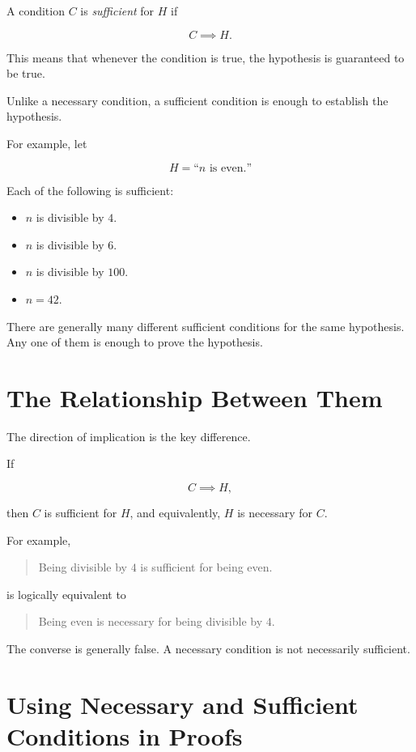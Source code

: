 \documentclass{essay}
\begin{document}
A condition \(C\) is \emph{sufficient} for \(H\) if

\[ C \implies H. \]

This means that whenever the condition is true, the hypothesis is guaranteed to be true.

Unlike a necessary condition, a sufficient condition is enough to establish the hypothesis.

For example, let

\[
  H = \text{``\(n\) is even.''}
\]

Each of the following is sufficient:

\begin{itemize}
  \item \(n\) is divisible by \(4\).
  \item \(n\) is divisible by \(6\).
  \item \(n\) is divisible by \(100\).
  \item \(n = 42\).
\end{itemize}

There are generally many different sufficient conditions for the same hypothesis. Any one of them is enough to prove the hypothesis.

\section*{The Relationship Between Them}

The direction of implication is the key difference.

If

\[ C \implies H, \]

then \(C\) is sufficient for \(H\), and equivalently, \(H\) is necessary for \(C\).

For example,

\begin{quote}
  Being divisible by \(4\) is sufficient for being even.
\end{quote}

is logically equivalent to

\begin{quote}
  Being even is necessary for being divisible by \(4\).
\end{quote}

The converse is generally false. A necessary condition is not necessarily sufficient.

\section*{Using Necessary and Sufficient Conditions in Proofs}
\end{document}
